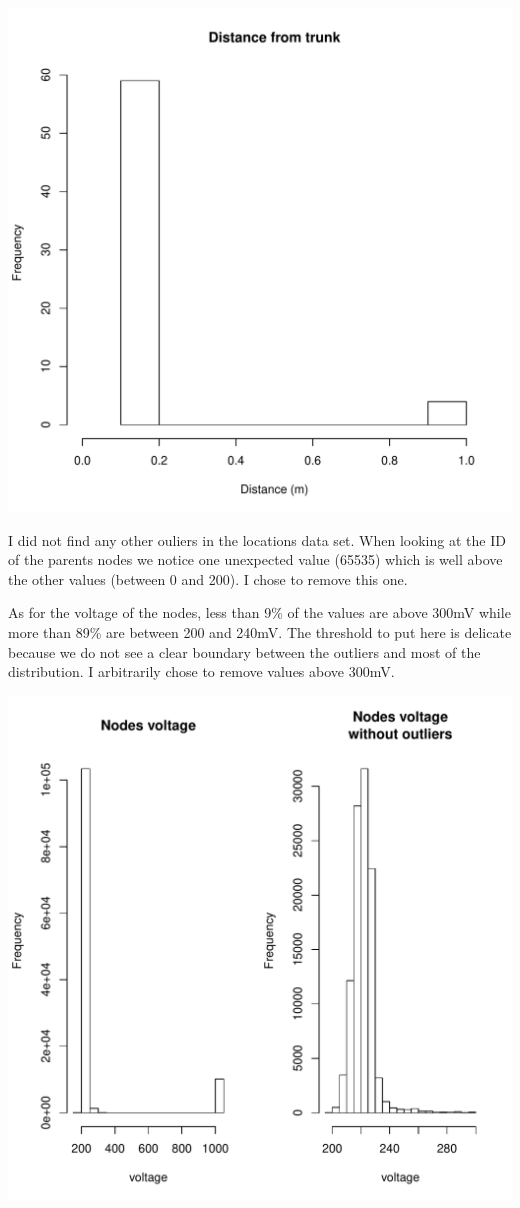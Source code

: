 \documentclass[11pt]{article}\usepackage[]{graphicx}\usepackage[]{color}
\newenvironment{knitrout}{}{} %
\begin{document}
\begin{knitrout}
\color{fgcolor}

{\centering \includegraphics[width=0.6\linewidth]{figure/unnamed-chunk-1-1} 

}



\end{knitrout}

I did not find any other ouliers in the locations data set. When looking at the ID of the parents nodes we notice one unexpected value (65535) which is well above the other values (between 0 and 200). I chose to remove this one.

As for the voltage of the nodes, less than 9\% of the values are above 300mV while more than 89\% are between 200 and 240mV. The threshold to put here is delicate because we do not see a clear boundary between the outliers and most of the distribution. I arbitrarily chose to remove values above 300mV.

\begin{knitrout}
\color{fgcolor}

{\centering \includegraphics[width=0.6\linewidth]{figure/unnamed-chunk-2-1} 

}



\end{knitrout}
\end{document}
